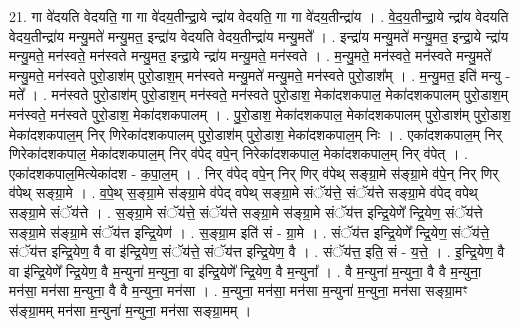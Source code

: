 \documentclass[17pt]{extarticle}
\begin{document}
21. गा वे॑दयति वेदयति॒ गा गा वे॑दय॒तीन्द्रा॒ये न्द्रा॑य वेदयति॒ गा गा वे॑दय॒तीन्द्रा॑य । . वे॒द॒य॒तीन्द्रा॒ये न्द्रा॑य वेदयति वेदय॒तीन्द्रा॑य मन्यु॒मते॑ मन्यु॒मत॒ इन्द्रा॑य वेदयति वेदय॒तीन्द्रा॑य मन्यु॒मते᳚ । . इन्द्रा॑य मन्यु॒मते॑ मन्यु॒मत॒ इन्द्रा॒ये न्द्रा॑य मन्यु॒मते॒ मन॑स्वते॒ मन॑स्वते मन्यु॒मत॒ इन्द्रा॒ये न्द्रा॑य मन्यु॒मते॒ मन॑स्वते । . म॒न्यु॒मते॒ मन॑स्वते॒ मन॑स्वते मन्यु॒मते॑ मन्यु॒मते॒ मन॑स्वते पुरो॒डाश॑म् पुरो॒डाश॒म् मन॑स्वते मन्यु॒मते॑ मन्यु॒मते॒ मन॑स्वते पुरो॒डाश᳚म् । . म॒न्यु॒मत॒ इति॑ मन्यु - मते᳚ । . मन॑स्वते पुरो॒डाश॑म् पुरो॒डाश॒म् मन॑स्वते॒ मन॑स्वते पुरो॒डाश॒ मेका॑दशकपाल॒ मेका॑दशकपालम् पुरो॒डाश॒म् मन॑स्वते॒ मन॑स्वते पुरो॒डाश॒ मेका॑दशकपालम् । . पु॒रो॒डाश॒ मेका॑दशकपाल॒ मेका॑दशकपालम् पुरो॒डाश॑म् पुरो॒डाश॒ मेका॑दशकपाल॒म् निर् णिरेका॑दशकपालम् पुरो॒डाश॑म् पुरो॒डाश॒ मेका॑दशकपाल॒म् निः । . एका॑दशकपाल॒म् निर् णिरेका॑दशकपाल॒ मेका॑दशकपाल॒म् निर् व॑पेद् वपे॒न् निरेका॑दशकपाल॒ मेका॑दशकपाल॒म् निर् व॑पेत् । . एका॑दशकपाल॒मित्येका॑दश - क॒पा॒ल॒म् । . निर् व॑पेद् वपे॒न् निर् णिर् व॑पेथ् सङ्ग्रा॒मे स॑ङ्ग्रा॒मे व॑पे॒न् निर् णिर् व॑पेथ् सङ्ग्रा॒मे । . व॒पे॒थ् स॒ङ्ग्रा॒मे स॑ङ्ग्रा॒मे व॑पेद् वपेथ् सङ्ग्रा॒मे संॅय॑त्ते॒ संॅय॑त्ते सङ्ग्रा॒मे व॑पेद् वपेथ् सङ्ग्रा॒मे संॅय॑त्ते । . स॒ङ्ग्रा॒मे संॅय॑त्ते॒ संॅय॑त्ते सङ्ग्रा॒मे स॑ङ्ग्रा॒मे संॅय॑त्त इन्द्रि॒येणे᳚ न्द्रि॒येण॒ संॅय॑त्ते सङ्ग्रा॒मे स॑ङ्ग्रा॒मे संॅय॑त्त इन्द्रि॒येण॑ । . स॒ङ्ग्रा॒म इति॑ सं - ग्रा॒मे । . संॅय॑त्त इन्द्रि॒येणे᳚ न्द्रि॒येण॒ संॅय॑त्ते॒ संॅय॑त्त इन्द्रि॒येण॒ वै वा इ॑न्द्रि॒येण॒ संॅय॑त्ते॒ संॅय॑त्त इन्द्रि॒येण॒ वै । . संॅय॑त्त॒ इति॒ सं - य॒त्ते॒ । . इ॒न्द्रि॒येण॒ वै वा इ॑न्द्रि॒येणे᳚ न्द्रि॒येण॒ वै म॒न्युना॑ म॒न्युना॒ वा इ॑न्द्रि॒येणे᳚ न्द्रि॒येण॒ वै म॒न्युना᳚ । . वै म॒न्युना॑ म॒न्युना॒ वै वै म॒न्युना॒ मन॑सा॒ मन॑सा म॒न्युना॒ वै वै म॒न्युना॒ मन॑सा । . म॒न्युना॒ मन॑सा॒ मन॑सा म॒न्युना॑ म॒न्युना॒ मन॑सा सङ्ग्रा॒मꣳ स॑ङ्ग्रा॒मम् मन॑सा म॒न्युना॑ म॒न्युना॒ मन॑सा सङ्ग्रा॒मम् । \newline
\end{document}
